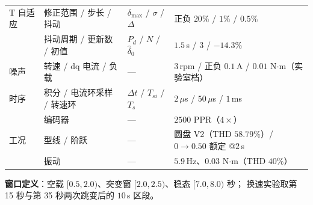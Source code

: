 \documentclass[11pt,a4paper]{article}
\theoremstyle{remark}\newtheorem{remark}{注}
\begin{document}
\begin{center}
\begin{tabular}{@{}llll@{}}
T 自适应 & 修正范围 / 步长 / 抖动 & $\delta_{\max}$ / $\sigma$ / $\Delta$ & 正负 $20\%$ / $1\%$ / $0.5\%$\\
 & 抖动周期 / 更新数 / 初值 & $P_d$ / $N$ / $\hat\delta_0$ & $1.5$\,s / $3$ / $-14.3\%$\\
\midrule
噪声 & 转速 / dq 电流 / 负载 & --- & $3$\,rpm / 正负 $0.1$\,A / $0.01$ N$\cdot$m（实验室档）\\
\midrule
时序 & 积分 / 电流环采样 / 转速环 & $\Delta t$ / $T_{si}$ / $T_s$ & $2\,\mu$s / $50\,\mu$s / $1$\,ms\\
 & 编码器 & --- & $2500$ PPR（$4\times$）\\
\midrule
工况 & 型线 / 阶跃 & --- & 圆盘 V2（THD $58.79\%$）/ $0\to0.50$ 额定 @$2$\,s\\
 & 振动 & --- & $5.9$\,Hz、$0.03$ N$\cdot$m（THD $40\%$）\\
\bottomrule
\end{tabular}
\end{center}
\noindent\textbf{窗口定义}：空载 $[0.5,2.0)$、突变窗 $[2.0,2.5)$、稳态 $[7.0,8.0)$ 秒；
换速实验取第 15 秒与第 35 秒两次跳变后的 $10$\,s 区段。

\end{document}
